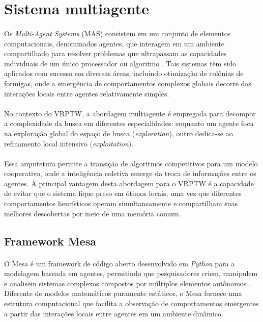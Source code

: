 \section{Sistema multiagente}
\label{sec:sma}

\paragraph{}Os \textit{Multi-Agent Systems} (MAS) consistem em um conjunto de elementos computacionais, denominados agentes, que interagem em um ambiente compartilhado para resolver problemas que ultrapassam as capacidades individuais de um único processador ou algoritmo \cite{Wooldridge95}. Tais sistemas têm sido aplicados com sucesso em diversas áreas, incluindo otimização de colônias de formigas, onde a emergência de comportamentos complexos globais decorre das interações locais entre agentes relativamente simples.

\paragraph{}No contexto do VRPTW, a abordagem multiagente é empregada para decompor a complexidade da busca em diferentes especialidades: enquanto um agente foca na exploração global do espaço de busca (\textit{exploration}), outro dedica-se ao refinamento local intensivo (\textit{exploitation}).

\paragraph{}Essa arquitetura permite a transição de algoritmos competitivos para um modelo cooperativo, onde a inteligência coletiva emerge da troca de informações entre os agentes. A principal vantagem desta abordagem para o VRPTW é a capacidade de evitar que o sistema fique preso em ótimos locais, uma vez que diferentes comportamentos heurísticos operam simultaneamente e compartilham suas melhores descobertas por meio de uma memória comum.

\subsection{Framework Mesa}

\paragraph{}O Mesa é um framework de código aberto desenvolvido em \textit{Python} para a modelagem baseada em agentes, permitindo que pesquisadores criem, manipulem e analisem sistemas complexos compostos por múltiplos elementos autônomos \cite{TerHoeven25}. Diferente de modelos matemáticos puramente estáticos, o Mesa fornece uma estrutura computacional que facilita a observação de comportamentos emergentes a partir das interações locais entre agentes em um ambiente dinâmico.

